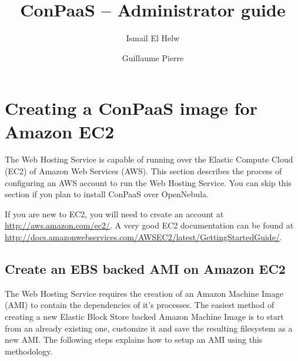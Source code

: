 \documentclass[10pt]{article}
\begin{document}
\title{ConPaaS -- Administrator guide}
\author{Ismail El Helw \and Guillaume Pierre}
\maketitle

\vfil
\tableofcontents
\vfil
\newpage

\section{Creating a ConPaaS image for Amazon EC2}

The Web Hosting Service is capable of running over the Elastic Compute
Cloud (EC2) of Amazon Web Services (AWS). This section describes the
process of configuring an AWS account to run the Web Hosting Service.
You can skip this section if you plan to install ConPaaS over
OpenNebula.

If you are new to EC2, you will need to create an account at
\url{http://aws.amazon.com/ec2/}. A very good EC2 documentation can be
found at
\url{http://docs.amazonwebservices.com/AWSEC2/latest/GettingStartedGuide/}.

\subsection{Create an EBS backed AMI on Amazon EC2}

The Web Hosting Service requires the creation of an Amazon Machine
Image (AMI) to contain the dependencies of it's processes.  The
easiest method of creating a new Elastic Block Store backed Amazon
Machine Image is to start from an already existing one, customize it
and save the resulting filesystem as a new AMI. The following steps
explains how to setup an AMI using this methodology.
\end{document}
